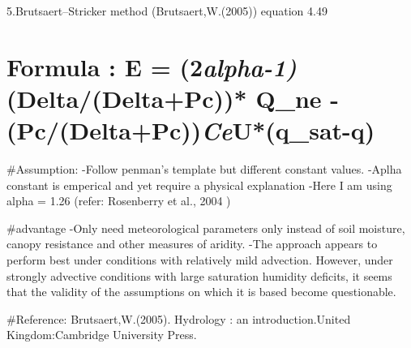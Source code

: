 \documentclass[
]{article}
\newenvironment{Shaded}{\begin{snugshade}}{\end{snugshade}}
\newcommand{\CommentTok}[1]{\textcolor[rgb]{0.56,0.35,0.01}{\textit{#1}}}
\newcommand{\FloatTok}[1]{\textcolor[rgb]{0.00,0.00,0.81}{#1}}
\newcommand{\NormalTok}[1]{#1}
\newcommand{\OtherTok}[1]{\textcolor[rgb]{0.56,0.35,0.01}{#1}}
\newcommand{\SpecialCharTok}[1]{\textcolor[rgb]{0.00,0.00,0.00}{#1}}
\begin{document}
\begin{Shaded}
\end{Shaded}

5.Brutsaert--Stricker method (Brutsaert,W.(2005)) equation 4.49

\hypertarget{formula-e-2alpha-1deltadeltapc-q_ne---pcdeltapcceuq_sat-q}{%
\section{\texorpdfstring{Formula : E =
(2\emph{alpha-1)}(Delta/(Delta+Pc))* Q\_ne -
(Pc/(Delta+Pc))\emph{Ce}U*(q\_sat-q)}{Formula : E = (2alpha-1)(Delta/(Delta+Pc))* Q\_ne - (Pc/(Delta+Pc))CeU*(q\_sat-q)}}\label{formula-e-2alpha-1deltadeltapc-q_ne---pcdeltapcceuq_sat-q}}

\#Assumption: -Follow penman's template but different constant values.
-Aplha constant is emperical and yet require a physical explanation
-Here I am using alpha = 1.26 (refer: Rosenberry et al., 2004 )

\#advantage -Only need meteorological parameters only instead of soil
moisture, canopy resistance and other measures of aridity. -The approach
appears to perform best under conditions with relatively mild advection.
However, under strongly advective conditions with large saturation
humidity deficits, it seems that the validity of the assumptions on
which it is based become questionable.

\#Reference: Brutsaert,W.(2005). Hydrology : an introduction.United
Kingdom:Cambridge University Press.
\end{document}
